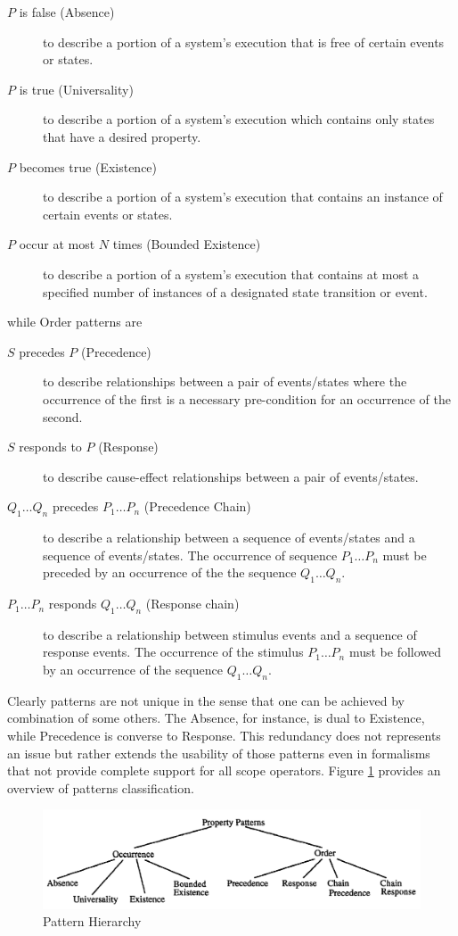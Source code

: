 \begin{description}
\item[$P$ is false (Absence)] to describe a portion of a system's execution that is free of certain events or states.
\item[$P$ is true (Universality)] to describe a portion of a system's execution which contains only states that have a desired property.
\item[$P$ becomes true (Existence)] to describe a portion of a system's execution that contains an instance of certain events or states.
\item[$P$ occur at most $N$ times (Bounded Existence)] to describe a portion of a system's execution that contains at most a specified number of instances of a designated state transition or event.
\end{description}
while Order patterns are
\begin{description}
\item[$S$ precedes $P$ (Precedence)] to describe relationships between a pair of events/states where the occurrence of the first is a necessary pre-condition for an occurrence of the second.
\item[$S$ responds to $P$ (Response)] to describe cause-effect relationships between a pair of events/states.
\item[$Q_1\dots Q_n$ precedes $P_1\dots P_n$ (Precedence Chain)] to describe a relationship between a sequence of events/states and a sequence of events/states. The occurrence of sequence $P_1\dots P_n$ must be preceded by an occurrence of the the sequence $Q_1\dots Q_n$.
\item[$P_1\dots P_n$ responds $Q_1\dots Q_n$ (Response chain)] to describe a relationship between stimulus events and a sequence of response events. The occurrence of the stimulus $P_1\dots P_n$ must be followed by an occurrence of the sequence $Q_1\dots Q_n$.
\end{description}
Clearly patterns are not unique in the sense that one can be achieved by combination of some others. The Absence, for instance, is dual to Existence, while Precedence is converse to Response. This redundancy does not represents an issue but rather extends the usability of those patterns even in formalisms that not provide complete support for all scope operators. Figure \ref{fig:phierarchy} provides an overview of patterns classification.
\begin{figure}[!h]
	\centering 
     \includegraphics[width=.9\textwidth]{Figs/hierarchy.PNG} 
     \caption{Pattern Hierarchy} 
     \label{fig:phierarchy} 
\end{figure} 


